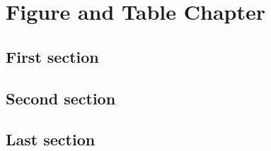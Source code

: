 \chapter{Figure and Table Chapter}
\lipsum[5]
\section{First section}
\lipsum[2-3]
\section{Second section} 
\lipsum[4-5]
\section{Last section}
\lipsum[6-7]